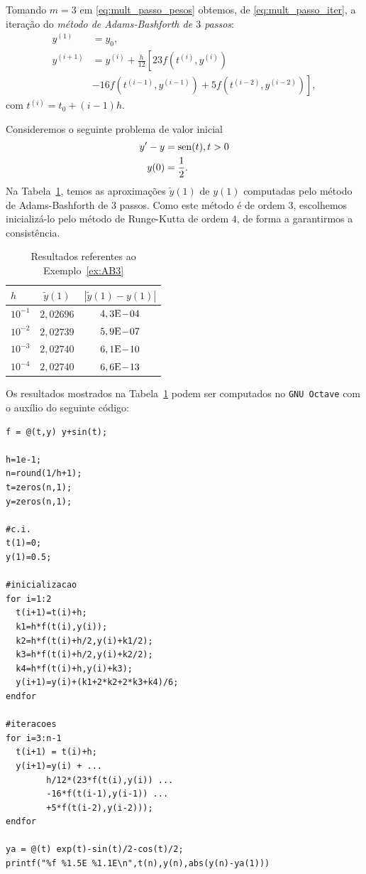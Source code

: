 Tomando $m=3$ em \eqref{eq:mult_passo_pesos} obtemos, de \eqref{eq:mult_passo_iter}, a iteração do \emph{método de Adams-Bashforth de $3$ passos}:
\begin{align}
  y^{(1)} &= y_0,\\
  y^{(i+1)} &= y^{(i)} + \frac{h}{12}\left[23f(t^{(i)},y^{(i)}) \right.\nonumber\\
              &\left. - 16f(t^{(i-1)},y^{(i-1)}) + 5f(t^{(i-2)},y^{(i-2)})\right],
\end{align}
com $t^{(i)} = t_0 + (i-1)h$.

\begin{ex}\label{ex:AB3}
  Consideremos o seguinte problema de valor inicial
  \begin{align}
    y' - y &= \operatorname{sen}(t), t>0\\
    y(0) &= \frac{1}{2}.
  \end{align}
  Na Tabela~\ref{tab:ex_AB3}, temos as aproximações $\tilde{y}(1)$ de $y(1)$ computadas pelo método de Adams-Bashforth de $3$ passos. Como este método é de ordem $3$, escolhemos inicializá-lo pelo método de Runge-Kutta de ordem $4$, de forma a garantirmos a consistência.
 
  \begin{table}[h!]
    \centering
    \begin{tabular}{l|cc}
      $h$ & $\tilde{y}(1)$ & $|\tilde{y}(1)-y(1)|$\\\hline
      $10^{-1}$ & $2,02696$ & $4,3\mathrm{E}\!-\!04$ \\
      $10^{-2}$ & $2,02739$ & $5,9\mathrm{E}\!-\!07$ \\
      $10^{-3}$ & $2,02740$ & $6,1\mathrm{E}\!-\!10$ \\
      $10^{-4}$ & $2,02740$ & $6,6\mathrm{E}\!-\!13$ \\\hline
   \end{tabular}
    \caption{Resultados referentes ao Exemplo~\ref{ex:AB3}}
    \label{tab:ex_AB3}
  \end{table}

\ifisoctave
Os resultados mostrados na Tabela~\ref{tab:ex_AB3} podem ser computados no \verb+GNU Octave+ com o auxílio do seguinte código:
\begin{verbatim}
f = @(t,y) y+sin(t);

h=1e-1;
n=round(1/h+1);
t=zeros(n,1);
y=zeros(n,1);

#c.i.
t(1)=0;
y(1)=0.5;

#inicializacao
for i=1:2
  t(i+1)=t(i)+h;
  k1=h*f(t(i),y(i));
  k2=h*f(t(i)+h/2,y(i)+k1/2);
  k3=h*f(t(i)+h/2,y(i)+k2/2);
  k4=h*f(t(i)+h,y(i)+k3);
  y(i+1)=y(i)+(k1+2*k2+2*k3+k4)/6;
endfor

#iteracoes
for i=3:n-1
  t(i+1) = t(i)+h;
  y(i+1)=y(i) + ...
        h/12*(23*f(t(i),y(i)) ...
        -16*f(t(i-1),y(i-1)) ...
        +5*f(t(i-2),y(i-2)));
endfor

ya = @(t) exp(t)-sin(t)/2-cos(t)/2;
printf("%f %1.5E %1.1E\n",t(n),y(n),abs(y(n)-ya(1)))
\end{verbatim}
\fi
\end{ex}

